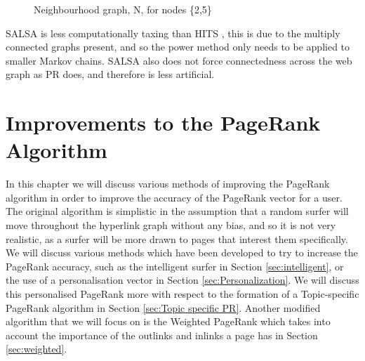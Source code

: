 \documentclass[11pt]{report}
\begin{document}
\begin{figure}[h] 
\centering
{} \qquad\qquad
{}
\caption{Neighbourhood graph, N,  for nodes \{2,5\} } \label{fig:N build}
\end{figure}

SALSA is less computationally taxing than HITS \cite{lempel2000stochastic}, this is due to the multiply connected graphs present, and so the power method only needs to be applied to smaller Markov chains. SALSA also does not force connectedness across the web graph as PR does, and therefore is less artificial. 



 
\chapter{Improvements to the PageRank Algorithm} \label{chap:Improve}
In this chapter we will discuss various methods of improving the PageRank algorithm in order to improve the accuracy of the PageRank vector for a user. The original algorithm is simplistic in the assumption that a random surfer will move throughout the hyperlink graph without any bias, and so it is not very realistic, as a surfer will be more drawn to pages that interest them specifically. We will discuss various methods which have been developed to try to increase the PageRank accuracy, such as the intelligent surfer in Section \ref{sec:intelligent}, or the use of a personalisation vector in Section \ref{sec:Personalization}. We will discuss this personalised PageRank more with respect to the formation of a Topic-specific PageRank algorithm in Section \ref{sec:Topic specific PR}. Another modified algorithm that we will focus on is the Weighted PageRank which takes into account the importance of the outlinks and inlinks a page has \cite{xing2004weighted} in Section \ref{sec:weighted}. 
\end{document}
